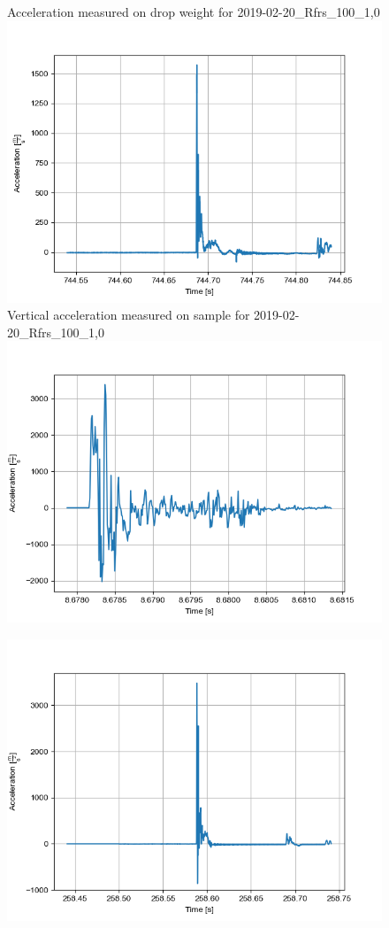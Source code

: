 \begin{figure}
    \centering
\subcaptionbox
{Acceleration measured on drop weight for 2019-02-20\_Rfrs\_100\_1,0
\label{fig:accdropweight1}}
{\includegraphics[width = 0.45\linewidth]{graph/2019-02-20_Rfrs_100_1,0.png}}
\subcaptionbox
{Vertical acceleration measured on sample for 2019-02-20\_Rfrs\_100\_1,0
\label{fig:accvertical1}}
{\includegraphics[width = 0.45\linewidth]{graph/2019-02-20_Rfrs_100_1,0_vertical.png}}


 {\includegraphics[width=0.45\linewidth]{graph/2019-04-16_Rfrs_75_0,5.png}}
    

\end{figure}
